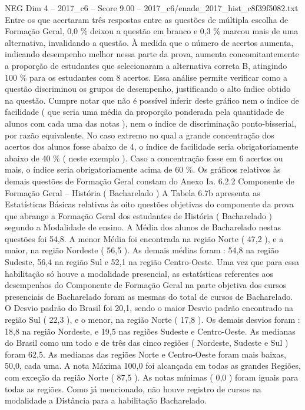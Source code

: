 \begin{textsample}{NEG Dim 4 – 2017\_c6 – Score 9.00 – 2017\_c6/enade\_2017\_hist\_c8f39f5082.txt}
Entre os que acertaram três respostas entre as questões de múltipla escolha de Formação Geral, 0,0 \% deixou a questão em branco e 0,3 \% marcou mais de uma alternativa, invalidando a questão.
À medida que o número de acertos aumenta, indicando desempenho melhor nessa parte da prova, aumenta concomitantemente a proporção de estudantes que selecionaram a alternativa correta B, atingindo 100 \% para os estudantes com 8 acertos.
Essa análise permite verificar como a questão discriminou os grupos de desempenho, justificando o alto índice obtido na questão.
Cumpre notar que não é possível inferir deste gráfico nem o índice de facilidade ( que seria uma média da proporção ponderada pela quantidade de alunos com cada uma das notas ), nem o índice de discriminação ponto-bisserial, por razão equivalente.
No caso extremo no qual a grande concentração dos acertos dos alunos fosse abaixo de 4, o índice de facilidade seria obrigatoriamente abaixo de 40 \% ( neste exemplo ).
Caso a concentração fosse em 6 acertos ou mais, o índice seria obrigatoriamente acima de 60 \%.
Os gráficos relativos às demais questões de Formação Geral constam do Anexo Ia. 6.2.2 Componente de Formação Geral – História ( Bacharelado ) A Tabela 6.7b apresenta as Estatísticas Básicas relativas às oito questões objetivas do componente da prova que abrange a Formação Geral dos estudantes de História ( Bacharelado ) segundo a Modalidade de ensino.
A Média dos alunos de Bacharelado nestas questões foi 54,8.
A menor Média foi encontrada na região Norte ( 47,2 ), e a maior, na região Nordeste ( 56,5 ).
As demais médias foram : 54,8 na região Sudeste, 56,4 na região Sul e 52,1 na região Centro-Oeste.
Uma vez que para essa habilitação só houve a modalidade presencial, as estatísticas referentes aos desempenhos do Componente de Formação Geral na parte objetiva dos cursos presenciais de Bacharelado foram as mesmas do total de cursos de Bacharelado.
O Desvio padrão do Brasil foi 20,1, sendo o maior Desvio padrão encontrado na região Sul ( 22,3 ), e o menor, na região Norte ( 17,8 ).
Os demais desvios foram : 18,8 na região Nordeste, e 19,5 nas regiões Sudeste e Centro-Oeste.
As medianas do Brasil como um todo e de três das cinco regiões ( Nordeste, Sudeste e Sul ) foram 62,5.
As medianas das regiões Norte e Centro-Oeste foram mais baixas, 50,0, cada uma.
A nota Máxima 100,0 foi alcançada em todas as grandes Regiões, com exceção da região Norte ( 87,5 ).
As notas mínimas ( 0,0 ) foram iguais para todas as regiões.
Como já mencionado, não houve registro de cursos na modalidade a Distância para a habilitação Bacharelado.

\end{textsample}
